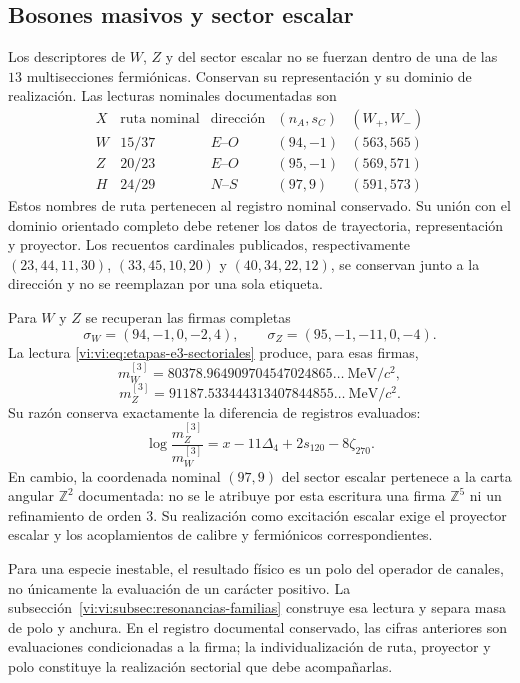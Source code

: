 \subsection{Bosones masivos y sector escalar}
\label{vi:vi:subsec:bosones-familias}

Los descriptores de \(W\), \(Z\) y del sector escalar no se fuerzan
dentro de una de las \(13\) multisecciones fermiónicas. Conservan su
representación y su dominio de realización. Las lecturas nominales
documentadas son
\[
\begin{array}{c|c|c|c|c}
 X&\text{ruta nominal}&\text{dirección}&(n_A,s_C)&(W_+,W_-)\\\hline
 W&15/37&E\text{--}O&(94,-1)&(563,565)\\
 Z&20/23&E\text{--}O&(95,-1)&(569,571)\\
 H&24/29&N\text{--}S&(97,9)&(591,573)
\end{array}
\]
Estos nombres de ruta pertenecen al registro nominal conservado. Su
unión con el dominio orientado completo debe retener los datos de
trayectoria, representación y proyector. Los recuentos cardinales
publicados, respectivamente \((23,44,11,30)\), \((33,45,10,20)\) y
\((40,34,22,12)\), se conservan junto a la dirección y no se reemplazan
por una sola etiqueta.

Para \(W\) y \(Z\) se recuperan las firmas completas
\[
 \sigma_W=(94,-1,0,-2,4),\qquad
 \sigma_Z=(95,-1,-11,0,-4).
\]
La lectura \eqref{vi:vi:eq:etapas-e3-sectoriales} produce, para esas firmas,
\[
 m_W^{[3]}=80378.964909704547024865\ldots\ \mathrm{MeV}/c^2,
\]
\[
 m_Z^{[3]}=91187.533444313407844855\ldots\ \mathrm{MeV}/c^2.
\]
Su razón conserva exactamente la diferencia de registros evaluados:
\[
 \log\frac{m_Z^{[3]}}{m_W^{[3]}}
 =x-11\Delta_4+2s_{120}-8\zeta_{270}.
\]
En cambio, la coordenada nominal \((97,9)\) del sector escalar pertenece
a la carta angular \(\mathbb Z^2\) documentada: no se le atribuye por
esta escritura una firma \(\mathbb Z^5\) ni un refinamiento de orden
\(3\). Su realización como excitación escalar exige el proyector
escalar y los acoplamientos de calibre y fermiónicos correspondientes.

Para una especie inestable, el resultado físico es un polo del operador
de canales, no únicamente la evaluación de un carácter positivo. La
subsección~\ref{vi:vi:subsec:resonancias-familias} construye esa lectura y
separa masa de polo y anchura. En el registro documental conservado,
las cifras anteriores son evaluaciones condicionadas a la firma; la
individualización de ruta, proyector y polo constituye la realización
sectorial que debe acompañarlas.

